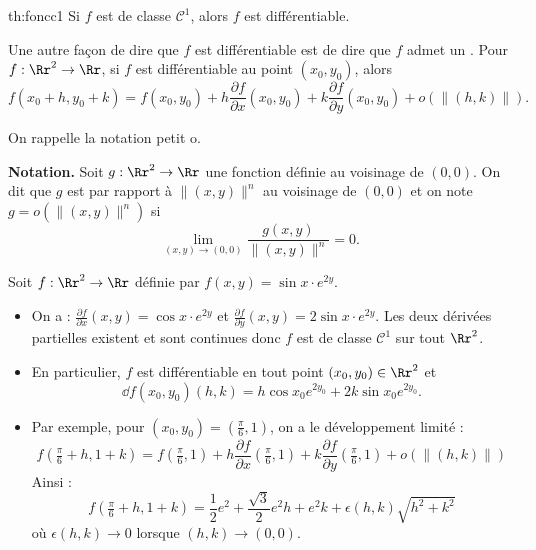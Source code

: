 \begin{theoreme}{}{th:foncc1}
	Si $f$ est de classe $\mathcal{C}^1$, alors $f$ est différentiable.
\end{theoreme}

Une autre façon de dire que $f$ est différentiable est de dire que $f$ admet un . Pour $f : \Rr^2 \to \Rr$, si $f$ est différentiable au point $(x_0,y_0)$, alors
$$f(x_0+h,y_0+k)=f(x_0,y_0)+h\frac{\partial f}{\partial x}(x_0,y_0)+k\frac{\partial f}{\partial y}(x_0,y_0)+o\left(\|(h,k)\|\right).$$

\bigskip

On rappelle la notation \og{}petit o\fg{}.

\textbf{Notation.} Soit $g :\Rr^2\to \Rr$ une fonction définie au voisinage de $(0,0)$. On dit que $g$ est  par rapport à $\|(x,y)\|^n$ au voisinage de $(0,0)$ et on note $g=o\left(\|(x,y)\|^n\right)$ si 
$$\lim_{(x,y)\to(0,0)}\frac{g(x,y)}{\|(x,y)\|^n}=0.$$

\begin{exemple}{}{}
	Soit $f : \Rr^2 \to \Rr$ définie par $f(x,y)=\sin x \cdot e ^{2y}$.
	
	\begin{itemize}
		\item On a : $\frac{\partial f}{\partial x}(x,y)=\cos x \cdot e ^{2y}$ et $\frac{\partial f}{\partial y}(x,y)=2\sin x \cdot e ^{2y}$. Les deux dérivées partielles existent et sont continues donc $f$ est de classe $\mathcal{C}^1$ sur tout $\Rr^2$. 
		
		\item En particulier, $f$ est différentiable en tout point $(x_0,y_0) \in \Rr^2$ et 
		$$\dd f (x_0,y_0)(h,k) = h\cos x_0 e ^{2y_0}+2k\sin x_0 e ^{2y_0}.$$
		
		\item Par exemple, pour $(x_0,y_0) = (\frac\pi6,1)$, on a le développement limité :
		$$f(\tfrac\pi6+h,1+k) = f(\tfrac\pi6,1) + 
		h\frac{\partial f}{\partial x}(\tfrac\pi6,1)+
		k \frac{\partial f}{\partial y}(\tfrac\pi6,1) + o\left(\|(h,k)\|\right)$$
		Ainsi :
		$$f(\tfrac\pi6+h,1+k) = \frac{1}{2}e^2 + \frac{\sqrt3}{2}e^2h + 
		e^2k + \epsilon(h,k)\sqrt{h^2+k^2}$$
		où $\epsilon(h,k) \to 0$ lorsque $(h,k) \to (0,0)$. 
	\end{itemize}
	
\end{exemple}



